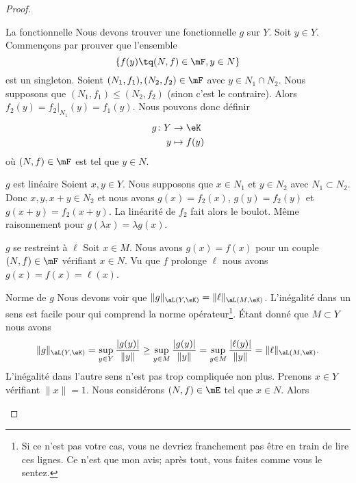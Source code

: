 \begin{proof}
\begin{subproof}
\begin{subproof}
        \item[La fonctionnelle]
            Nous devons trouver une fonctionnelle \( g\) sur \( Y\). Soit \( y\in Y\). Commençons par prouver que l'ensemble
            \begin{equation}
                \{ f(y)\tq (N,f)\in \mF, y\in N \}
            \end{equation}
            est un singleton. Soient \( (N_1,f_1), (N_2,f_2)\in\mF\) avec \( y\in N_1\cap N_2\). Nous supposons que \( (N_1,f_1)\leq (N_2,f_2)\) (sinon c'est le contraire). Alors \( f_2(y)=f_2|_{N_1}(y)=f_1(y)\). Nous pouvons donc définir
            \begin{equation}
                \begin{aligned}
                    g\colon Y&\to \eK \\
                    y&\mapsto f(y) 
                \end{aligned}
            \end{equation}
            où \( (N,f)\in \mF\) est tel que \( y\in N\).
        \item[\( g\) est linéaire]
            Soient \( x,y\in Y\). Nous supposons que \( x\in N_1\) et \( y\in N_2\) avec \( N_1\subset N_2\). Donc \( x,y,x+y\in N_2\) et nous avons \( g(x)=f_2(x)\), \( g(y)=f_2(y)\) et \( g(x+y)=f_2(x+y)\). La linéarité de \( f_2\) fait alors le boulot. Même raisonnement pour \( g(\lambda x)=\lambda g(x)\).
        \item[\( g\) se restreint à \( \ell\)]
            Soit \( x\in M\). Nous avons \( g(x)=f(x)\) pour un couple \( (N,f)\in \mF\) vérifiant \( x\in N\). Vu que \( f\) prolonge \( \ell\) nous avons \( g(x)=f(x)=\ell(x)\).
        \item[Norme de \( g\)]
            Nous devons voir que \( \| g \|_{\aL(Y,\eK)}=\| \ell \|_{\aL(M,\eK)}\). L'inégalité dans un sens est facile pour qui comprend la norme opérateur\footnote{Si ce n'est pas votre cas, vous ne devriez franchement pas être en train de lire ces lignes. Ce n'est que mon avis; après tout, vous faites comme vous le sentez.}. Étant donné que \( M\subset Y\) nous avons
            \begin{equation}
                \| g \|_{\aL(Y,\eK)}=\sup_{y\in Y}\frac{ | g(y) | }{ \| y \| }\geq\sup_{y\in M}\frac{ | g(y) | }{ \| y \| }=\sup_{y\in M}\frac{ | \ell(y) | }{ \| y \| }=\| \ell \|_{\aL(M,\eK)}.
            \end{equation}
            L'inégalité dans l'autre sens n'est pas trop compliquée non plus. Prenons \( x\in Y\) vérifiant \( \| x \|=1\). Nous considérons \( (N,f)\in \mE\) tel que \( x\in N\). Alors

\end{subproof}
\end{subproof}
\end{proof}
